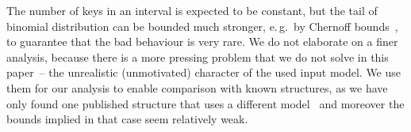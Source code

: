 The number of keys in an interval is expected to be constant, but the tail of binomial distribution can be bounded much stronger, e.\,g.~by Chernoff bounds~\cite[chapter~4.1]{randomAlgs}, to guarantee that the bad behaviour is very rare.
We do not elaborate on a finer analysis, because there is a more pressing problem that we do not solve in this paper~-- the unrealistic (unmotivated) character of the used input model.
We use them for our analysis to enable comparison with known structures, as we have only found one published structure that uses a different model~\cite{DemaineJP04} and moreover the bounds implied in that case seem relatively weak. %



